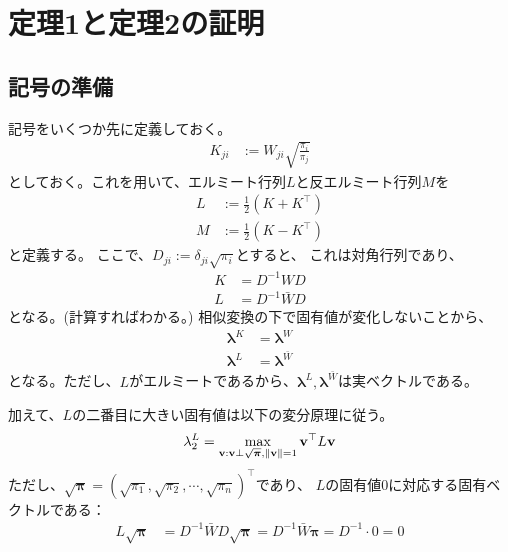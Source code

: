 \documentclass[a4paper,11pt]{jsarticle}
\numberwithin{equation}{section}
\begin{document}
\section{定理1と定理2の証明}
\subsection{記号の準備}
記号をいくつか先に定義しておく。
\begin{align}
    K_{ji} &:= W_{ji} \sqrt{\frac{\pi_i}{\pi_j}}
\end{align}
としておく。これを用いて、エルミート行列$L$と反エルミート行列$M$を
\begin{align}
    L &:= \frac{1}{2} (K + K^{\top})\\
    M &:= \frac{1}{2} (K - K^{\top})
\end{align}
と定義する。
ここで、$D_{ji} := \delta_{ji} \sqrt{\pi_i}$とすると、
これは対角行列であり、
\begin{align}
    K &= D^{-1} W D\\
    L &= D^{-1} \bar{W} D
\end{align}
となる。(計算すればわかる。)
相似変換の下で固有値が変化しないことから、
\begin{align}
    \bm{\lambda}^K &= \bm{\lambda}^W\\
    \bm{\lambda}^L &= \bm{\lambda}^{\bar{W}}
\end{align}
となる。ただし、$L$がエルミートであるから、$\bm{\lambda}^L, \bm{\lambda}^{\bar{W}}$は実ベクトルである。

加えて、$L$の二番目に大きい固有値は以下の変分原理に従う。
\begin{align}
    \lambda_{2}^L = \max_{\vb{v}:\vb{v} \perp \sqrt{\bm{\pi}}, \norm{\vb{v}}=1} \vb{v}^{\top} L \vb{v} \label{eq:var_principle}
\end{align}
ただし、$\sqrt{\bm{\pi}} = (\sqrt{\pi_1}, \sqrt{\pi_2}, \cdots, \sqrt{\pi_n})^{\top}$であり、
$L$の固有値0に対応する固有ベクトルである：
    \begin{align}
        L\sqrt{\bm{\pi}} &= D^{-1} \bar{W} D \sqrt{\bm{\pi}}= D^{-1} \bar{W} \bm{\pi}= D^{-1} \cdot 0 = 0
    \end{align}
\end{document}
